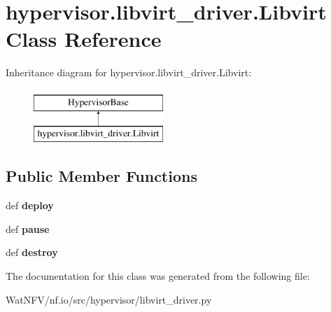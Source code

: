\hypertarget{classhypervisor_1_1libvirt__driver_1_1Libvirt}{\section{hypervisor.\-libvirt\-\_\-driver.\-Libvirt Class Reference}
\label{classhypervisor_1_1libvirt__driver_1_1Libvirt}
}
Inheritance diagram for hypervisor.\-libvirt\-\_\-driver.\-Libvirt\-:\begin{figure}[H]
\begin{center}
\leavevmode
\includegraphics[height=2.000000cm]{classhypervisor_1_1libvirt__driver_1_1Libvirt}
\end{center}
\end{figure}
\subsection*{Public Member Functions}
\begin{DoxyCompactItemize}
\item 
\hypertarget{classhypervisor_1_1libvirt__driver_1_1Libvirt_ab8f6a87c28e570ecc55693e665b915fa}{def {\bfseries deploy}}\label{classhypervisor_1_1libvirt__driver_1_1Libvirt_ab8f6a87c28e570ecc55693e665b915fa}

\item 
\hypertarget{classhypervisor_1_1libvirt__driver_1_1Libvirt_ae82b6fcef27839a8db06edfb0857ee9e}{def {\bfseries pause}}\label{classhypervisor_1_1libvirt__driver_1_1Libvirt_ae82b6fcef27839a8db06edfb0857ee9e}

\item 
\hypertarget{classhypervisor_1_1libvirt__driver_1_1Libvirt_a48a5b9aa63f54fff5c4bcfd2dbdf104a}{def {\bfseries destroy}}\label{classhypervisor_1_1libvirt__driver_1_1Libvirt_a48a5b9aa63f54fff5c4bcfd2dbdf104a}

\end{DoxyCompactItemize}


The documentation for this class was generated from the following file\-:\begin{DoxyCompactItemize}
\item 
Wat\-N\-F\-V/nf.\-io/src/hypervisor/libvirt\-\_\-driver.\-py\end{DoxyCompactItemize}
